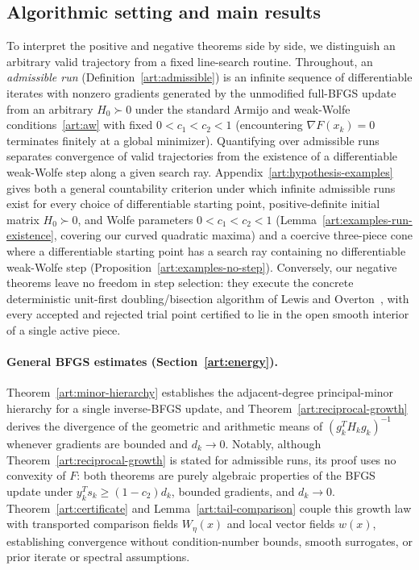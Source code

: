 \subsection{Algorithmic setting and main results}

To interpret the positive and negative theorems side by side, we distinguish an
arbitrary valid trajectory from a fixed line-search routine. Throughout, an
\emph{admissible run} (Definition~\ref{art:admissible}) is an infinite sequence
of differentiable iterates with nonzero gradients generated by the unmodified
full-BFGS update from an arbitrary $H_0\succ0$ under the standard Armijo and
weak-Wolfe conditions~\eqref{art:aw} with fixed $0<c_1<c_2<1$ (encountering
$\nabla F(x_k)=0$ terminates finitely at a global minimizer). Quantifying over admissible runs separates convergence of valid trajectories
from the existence of a differentiable weak-Wolfe step along a given search ray.
Appendix~\ref{art:hypothesis-examples} gives both a general countability
criterion under which infinite admissible runs exist for every choice of
differentiable starting point, positive-definite initial matrix $H_0\succ0$, and
Wolfe parameters $0<c_1<c_2<1$ (Lemma~\ref{art:examples-run-existence}, covering
our curved quadratic maxima) and a coercive three-piece cone where a
differentiable starting point has a search ray containing no differentiable
weak-Wolfe step (Proposition~\ref{art:examples-no-step}). Conversely, our
negative theorems leave no freedom in step selection: they execute the concrete
deterministic unit-first doubling/bisection algorithm of Lewis and
Overton~\cite[Algorithm~4.6]{LO}, with every accepted and rejected trial point
certified to lie in the open smooth interior of a single active piece.

\paragraph{General BFGS estimates (Section~\ref{art:energy}).}
Theorem~\ref{art:minor-hierarchy} establishes the adjacent-degree principal-minor
hierarchy for a single inverse-BFGS update, and Theorem~\ref{art:reciprocal-growth}
derives the divergence of the geometric and arithmetic means of
$(g_k^TH_kg_k)^{-1}$ whenever gradients are bounded and $d_k\to0$. Notably,
although Theorem~\ref{art:reciprocal-growth} is stated for admissible runs, its
proof uses no convexity of $F$: both theorems are purely algebraic properties of
the BFGS update under $y_k^Ts_k\ge(1-c_2)d_k$, bounded gradients, and $d_k\to0$.
Theorem~\ref{art:certificate} and Lemma~\ref{art:tail-comparison} couple this
growth law with transported comparison fields $W_\eta(x)$ and local vector
fields $w(x)$, establishing convergence without condition-number bounds, smooth
surrogates, or prior iterate or spectral assumptions.


